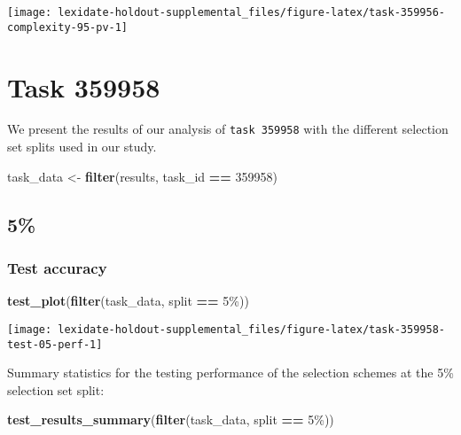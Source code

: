 \documentclass[
]{book}
\newenvironment{Shaded}{\begin{snugshade}}{\end{snugshade}}
\newcommand{\DecValTok}[1]{\textcolor[rgb]{0.00,0.00,0.81}{#1}}
\newcommand{\FunctionTok}[1]{\textcolor[rgb]{0.13,0.29,0.53}{\textbf{#1}}}
\newcommand{\NormalTok}[1]{#1}
\newcommand{\OtherTok}[1]{\textcolor[rgb]{0.56,0.35,0.01}{#1}}
\newcommand{\SpecialCharTok}[1]{\textcolor[rgb]{0.81,0.36,0.00}{\textbf{#1}}}
\newcommand{\StringTok}[1]{\textcolor[rgb]{0.31,0.60,0.02}{#1}}
\begin{document}
\texttt{[image: lexidate-holdout-supplemental\_files/figure-latex/task-359956-complexity-95-pv-1]}

\hypertarget{task-359958}{%
\chapter{Task 359958}\label{task-359958}}

We present the results of our analysis of \texttt{task\ 359958} with the different selection set splits used in our study.

\begin{Shaded}
\begin{Highlighting}[]
\NormalTok{task\_data }\OtherTok{\textless{}{-}} \FunctionTok{filter}\NormalTok{(results, task\_id }\SpecialCharTok{==} \DecValTok{359958}\NormalTok{)}
\end{Highlighting}
\end{Shaded}

\hypertarget{section-30}{%
\section{5\%}\label{section-30}}

\hypertarget{test-accuracy-30}{%
\subsection{Test accuracy}\label{test-accuracy-30}}

\begin{Shaded}
\begin{Highlighting}[]
\FunctionTok{test\_plot}\NormalTok{(}\FunctionTok{filter}\NormalTok{(task\_data, split }\SpecialCharTok{==} \StringTok{\textquotesingle{}5\%\textquotesingle{}}\NormalTok{))}
\end{Highlighting}
\end{Shaded}

\texttt{[image: lexidate-holdout-supplemental\_files/figure-latex/task-359958-test-05-perf-1]}

Summary statistics for the testing performance of the selection schemes at the 5\% selection set split:

\begin{Shaded}
\begin{Highlighting}[]
\FunctionTok{test\_results\_summary}\NormalTok{(}\FunctionTok{filter}\NormalTok{(task\_data, split }\SpecialCharTok{==} \StringTok{\textquotesingle{}5\%\textquotesingle{}}\NormalTok{))}
\end{Highlighting}
\end{Shaded}
\end{document}
